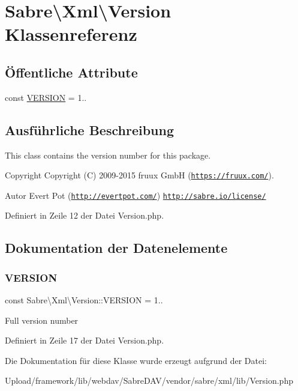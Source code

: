 \hypertarget{class_sabre_1_1_xml_1_1_version}{}\section{Sabre\textbackslash{}Xml\textbackslash{}Version Klassenreferenz}
\label{class_sabre_1_1_xml_1_1_version}
\subsection*{Öffentliche Attribute}
\begin{DoxyCompactItemize}
\item 
const \mbox{\hyperlink{class_sabre_1_1_xml_1_1_version_a1c735a637543377476adea0aeb14c431}{V\+E\+R\+S\+I\+ON}} = \textquotesingle{}1..\textquotesingle{}
\end{DoxyCompactItemize}


\subsection{Ausführliche Beschreibung}
This class contains the version number for this package.

\begin{DoxyCopyright}{Copyright}
Copyright (C) 2009-\/2015 fruux GmbH (\href{https://fruux.com/}{\tt https\+://fruux.\+com/}). 
\end{DoxyCopyright}
\begin{DoxyAuthor}{Autor}
Evert Pot (\href{http://evertpot.com/}{\tt http\+://evertpot.\+com/})  \href{http://sabre.io/license/}{\tt http\+://sabre.\+io/license/} 
\end{DoxyAuthor}


Definiert in Zeile 12 der Datei Version.\+php.



\subsection{Dokumentation der Datenelemente}
\mbox{\label{class_sabre_1_1_xml_1_1_version_a1c735a637543377476adea0aeb14c431}} 
\subsubsection{\texorpdfstring{V\+E\+R\+S\+I\+ON}{VERSION}}
{\footnotesize\ttfamily const Sabre\textbackslash{}\+Xml\textbackslash{}\+Version\+::\+V\+E\+R\+S\+I\+ON = \textquotesingle{}1..\textquotesingle{}}

Full version number 

Definiert in Zeile 17 der Datei Version.\+php.



Die Dokumentation für diese Klasse wurde erzeugt aufgrund der Datei\+:\begin{DoxyCompactItemize}
\item 
Upload/framework/lib/webdav/\+Sabre\+D\+A\+V/vendor/sabre/xml/lib/Version.\+php\end{DoxyCompactItemize}
